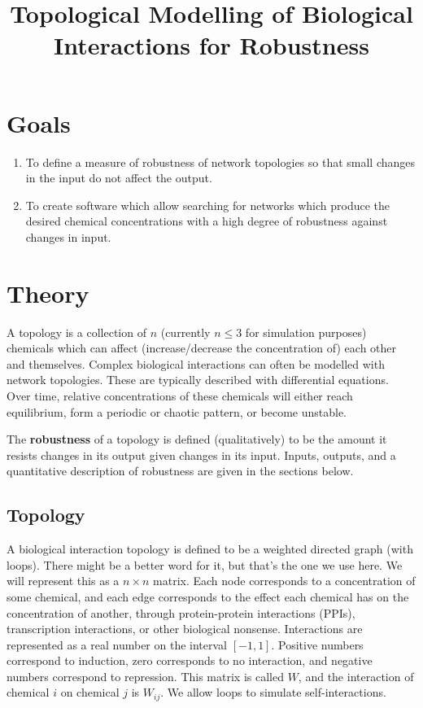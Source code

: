 \documentclass{article}
\title{Topological Modelling of Biological Interactions for Robustness}
\date{}
\begin{document}
\maketitle
\vspace{-50pt}

\section{Goals}
\begin{enumerate}
\item To define a measure of robustness of network topologies so that small changes in the input do not affect the output.
\item To create software which allow searching for networks which produce the desired chemical concentrations with a high degree of robustness against changes in input.
\end{enumerate}

\section{Theory}
A topology is a collection of $n$ (currently $n \le 3$ for simulation purposes) chemicals which can affect (increase/decrease the concentration of) each other and themselves. Complex biological interactions can often be modelled with network topologies. These are typically described with differential equations. Over time, relative concentrations of these chemicals will either reach equilibrium, form a periodic or chaotic pattern, or become unstable.

The \textbf{robustness} of a topology is defined (qualitatively) to be the amount it resists changes in its output given changes in its input. Inputs, outputs, and a quantitative description of robustness are given in the sections below.

\subsection{Topology} \label{topology-weights}
A biological interaction topology is defined to be a weighted directed graph (with loops). There might be a better word for it, but that's the one we use here. We will represent this as a $n \times n$ matrix. Each node corresponds to a concentration of some chemical, and each edge corresponds to the effect each chemical has on the concentration of another, through protein-protein interactions (PPIs), transcription interactions, or other biological nonsense. Interactions are represented as a real number on the interval $[-1,1]$. Positive numbers correspond to induction, zero corresponds to no interaction, and negative numbers correspond to repression. This matrix is called $W$, and the interaction of chemical $i$ on chemical $j$ is $W_{ij}$. We allow loops to simulate self-interactions.
\end{document}
